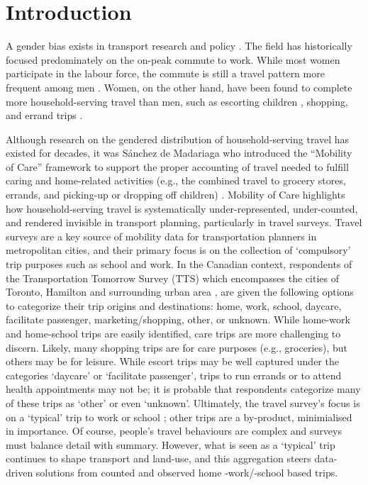 \documentclass[
  authoryear,
  preprint,
  3p]{elsarticle}
\begin{document}
\section{Introduction}\label{introduction}

A gender bias exists in transport research and policy
\citep{sanchezdemadariagaMobilityCareIntroducing2013, lawWomenTransportNew1999, siemiatyckiGenderedProductionInfrastructure2020}.
The field has historically focused predominately on the on-peak commute
to work. While most women participate in the labour force, the commute
is still a travel pattern more frequent among men
\citep{sanchezdemadariagaMobilityCareIntroducing2013}. Women, on the
other hand, have been found to complete more household-serving travel
than men, such as escorting children
\citep{craigGenderMobilityParental2019, taylorWhatExplainsGender2015, hanTaskAllocationGender2019, mcdonaldExploratoryAnalysisChildren2006},
shopping, and errand trips
\citep{taylorWhatExplainsGender2015, rootWomenTravelIdea2000, sweetGenderDifferencesRole2016}.

Although research on the gendered distribution of household-serving
travel has existed for decades, it was Sánchez de Madariaga who
introduced the ``Mobility of Care'' framework to support the proper
accounting of travel needed to fulfill caring and home-related
activities (e.g., the combined travel to grocery stores, errands, and
picking-up or dropping off children)
\citep{sanchezdemadariagaMobilityCareIntroducing2013}. Mobility of Care
highlights how household-serving travel is systematically
under-represented, under-counted, and rendered invisible in transport
planning, particularly in travel surveys. Travel surveys are a key
source of mobility data for transportation planners in metropolitan
cities, and their primary focus is on the collection of `compulsory'
trip purposes such as school and work. In the Canadian context,
respondents of the Transportation Tomorrow Survey (TTS) which
encompasses the cities of Toronto, Hamilton and surrounding urban area
\citep{transportationtomorrowsurvey2018}, are given the following
options to categorize their trip origins and destinations: home, work,
school, daycare, facilitate passenger, marketing/shopping, other, or
unknown. While home-work and home-school trips are easily identified,
care trips are more challenging to discern. Likely, many shopping trips
are for care purposes (e.g., groceries), but others may be for leisure.
While escort trips may be well captured under the categories `daycare'
or `facilitate passenger', trips to run errands or to attend health
appointments may not be; it is probable that respondents categorize many
of these trips as `other' or even `unknown'. Ultimately, the travel
survey's focus is on a `typical' trip to work or school
\citep{transportationtomorrowsurvey2018}; other trips are a by-product,
minimialised in importance. Of course, people's travel behaviours are
complex and surveys must balance detail with summary. However, what is
seen as a `typical' trip continues to shape transport and land-use, and
this aggregation steers data-driven solutions from counted and observed
home -work/-school based trips.
\end{document}
